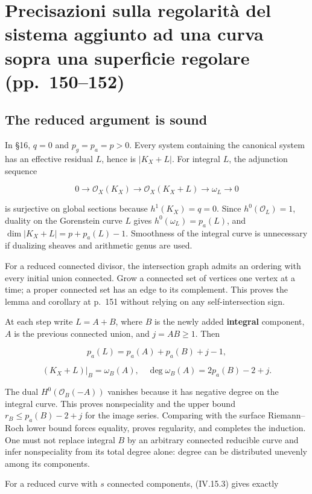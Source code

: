 \section[Regolarità degli aggiunti]{Precisazioni sulla regolarità del sistema aggiunto ad una curva sopra una superficie regolare (pp.~150--152)}\label{enriques-iv-16}

\subsection{The reduced argument is sound}

In §16, \(q=0\) and \(p_g=p_a=p>0\). Every system containing the canonical system has an effective residual \(L\), hence is \(|K_X+L|\). For integral \(L\), the adjunction sequence

\[
0\to\mathcal O_X(K_X)\to\mathcal O_X(K_X+L)
\to\omega_L\to0
\]

is surjective on global sections because \(h^1(K_X)=q=0\). Since \(h^0(\mathcal O_L)=1\), duality on the Gorenstein curve \(L\) gives \(h^0(\omega_L)=p_a(L)\), and \(\dim|K_X+L|=p+p_a(L)-1\). Smoothness of the integral curve is unnecessary if dualizing sheaves and arithmetic genus are used.

For a reduced connected divisor, the intersection graph admits an ordering with every initial union connected. Grow a connected set of vertices one vertex at a time; a proper connected set has an edge to its complement. This proves the lemma and corollary at p.~151 without relying on any self-intersection sign.

At each step write \(L=A+B\), where \(B\) is the newly added \textbf{integral} component, \(A\) is the previous connected union, and \(j=AB\ge1\). Then

\[
p_a(L)=p_a(A)+p_a(B)+j-1,
\]

\[
(K_X+L)|_B=\omega_B(A),\quad
\deg\omega_B(A)=2p_a(B)-2+j.
\]

The dual \(H^0(\mathcal O_B(-A))\) vanishes because it has negative degree on the integral curve. This proves nonspeciality and the upper bound \(r_B\le p_a(B)-2+j\) for the image series. Comparing with the surface Riemann--Roch lower bound forces equality, proves regularity, and completes the induction. One must not replace integral \(B\) by an arbitrary connected reducible curve and infer nonspeciality from its total degree alone: degree can be distributed unevenly among its components.

For a reduced curve with \(s\) connected components, (IV.15.3) gives exactly

